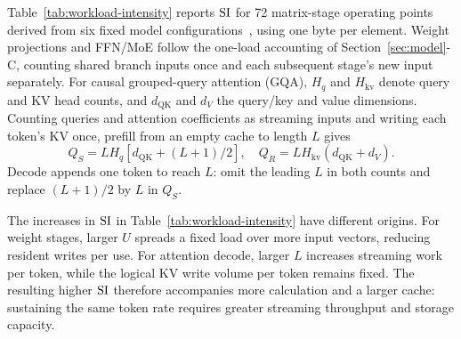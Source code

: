 Table~\ref{tab:workload-intensity} reports $\mathrm{SI}$ for 72 matrix-stage operating points derived from six fixed model configurations~\cite{qwen35,ministral3,qwen36,hy3,ling,mimo}, using one byte per element. Weight projections and FFN/MoE follow the one-load accounting of Section~\ref{sec:model}-C, counting shared branch inputs once and each subsequent stage's new input separately. For causal grouped-query attention (GQA), $H_q$ and $H_{\mathrm{kv}}$ denote query and KV head counts, and $d_{\mathrm{QK}}$ and $d_V$ the query/key and value dimensions. Counting queries and attention coefficients as streaming inputs and writing each token's KV once, prefill from an empty cache to length $L$ gives
\begin{equation}
 Q_S=LH_q[d_{\mathrm{QK}}+(L+1)/2],\quad
 Q_R=LH_{\mathrm{kv}}(d_{\mathrm{QK}}+d_V).
 \label{eq:attention-prefill}
\end{equation}
Decode appends one token to reach $L$: omit the leading $L$ in both counts and replace $(L+1)/2$ by $L$ in $Q_S$.

The increases in $\mathrm{SI}$ in Table~\ref{tab:workload-intensity} have different origins. For weight stages, larger $U$ spreads a fixed load over more input vectors, reducing resident writes per use. For attention decode, larger $L$ increases streaming work per token, while the logical KV write volume per token remains fixed. The resulting higher $\mathrm{SI}$ therefore accompanies more calculation and a larger cache: sustaining the same token rate requires greater streaming throughput and storage capacity.